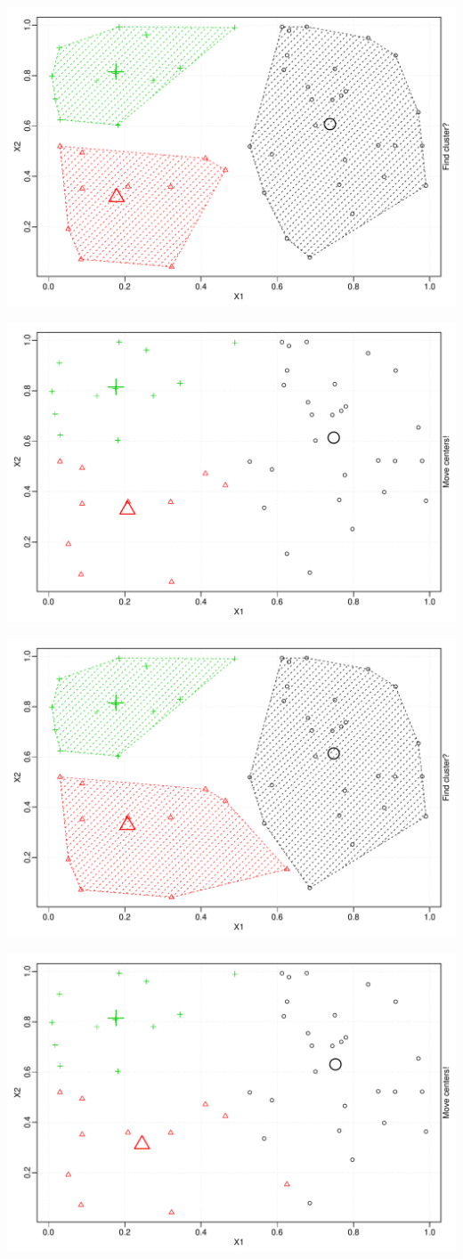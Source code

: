 \documentclass{beamer}\usepackage[]{graphicx}\usepackage[]{color}
\newenvironment{knitrout}{}{} %
\begin{document}
\begin{frame}
\begin{knitrout}
\includegraphics[width=.8\textwidth]{figures/unnamed-chunk-1-8} 

\includegraphics[width=.8\textwidth]{figures/unnamed-chunk-1-9} 

\includegraphics[width=.8\textwidth]{figures/unnamed-chunk-1-10} 

\includegraphics[width=.8\textwidth]{figures/unnamed-chunk-1-11} 


\end{knitrout}
\end{frame}
\end{document}

